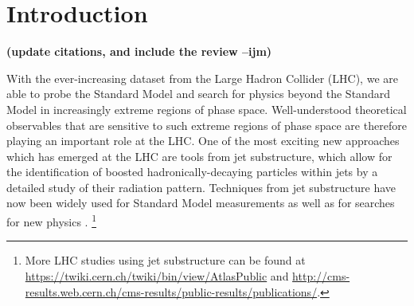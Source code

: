 \documentclass[11pt,letterpaper]{article}
\newcommand{\ijm}[1]{\textbf{\textcolor{llblue}{(#1 --ijm)}}}
\begin{document}
\maketitle

\section{Introduction}\label{sec:intro}

\ijm{update citations, and include the review}

With the ever-increasing dataset from the Large Hadron Collider (LHC), we are able to probe the Standard Model and search for physics beyond the Standard Model in increasingly extreme regions of phase space.
%
Well-understood theoretical observables that are sensitive to such extreme regions of phase space are therefore playing an important role at the LHC.
%
One of the most exciting new approaches which has emerged at the LHC are tools from jet substructure, which allow for the identification of boosted hadronically-decaying particles within jets by a detailed study of their radiation pattern.
%
Techniques from jet substructure have now been widely used for Standard Model measurements \cite{Chatrchyan:2012sn,CMS:2013cda,Aad:2015cua,Aad:2015lxa,ATLAS-CONF-2015-035,Aad:2015rpa,Aad:2015hna,ATLAS-CONF-2016-002,ATLAS-CONF-2016-039,ATLAS-CONF-2016-034,CMS-PAS-TOP-16-013,CMS-PAS-HIG-16-004} as well as for searches for new physics  \cite{CMS:2011bqa,Fleischmann:2013woa,Pilot:2013bla,TheATLAScollaboration:2013qia,Chatrchyan:2012ku,CMS-PAS-B2G-14-001,CMS-PAS-B2G-14-002,Khachatryan:2015axa,Khachatryan:2015bma,Aad:2015owa,Aaboud:2016okv,Aaboud:2016trl,Aaboud:2016qgg,ATLAS-CONF-2016-055,ATLAS-CONF-2015-071,ATLAS-CONF-2015-068,CMS-PAS-EXO-16-037,CMS-PAS-EXO-16-040,Khachatryan:2016mdm,CMS-PAS-HIG-16-016,CMS-PAS-B2G-15-003,CMS-PAS-EXO-16-017}.%
\footnote{More LHC studies using jet substructure can be found at \url{https://twiki.cern.ch/twiki/bin/view/AtlasPublic} and \url{http://cms-results.web.cern.ch/cms-results/public-results/publications/}.} 
\end{document}
